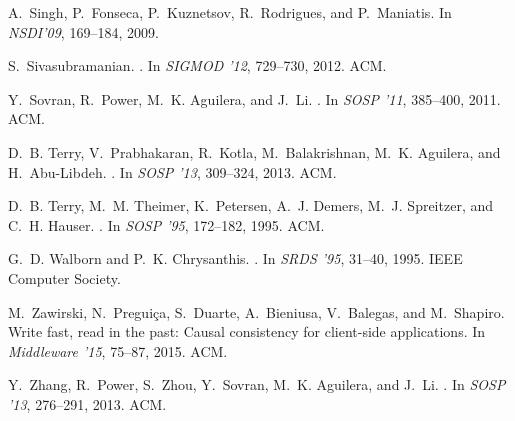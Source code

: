 \documentclass[11pt,dvipdfm]{article}
\begin{document}
\begin{thebibliography}{10}
\begin{small}
A.~Singh, P.~Fonseca, P.~Kuznetsov, R.~Rodrigues, and P.~Maniatis.
\newblock In {\em NSDI'09}, 169--184, 2009.

S.~Sivasubramanian.
.
\newblock In {\em SIGMOD '12}, 729--730, 2012. ACM.

Y.~Sovran, R.~Power, M.~K. Aguilera, and J.~Li.
.
\newblock In {\em SOSP  '11}, 385--400, 2011. ACM.


D.~B. Terry, V.~Prabhakaran, R.~Kotla, M.~Balakrishnan, M.~K. Aguilera, and
  H.~Abu-Libdeh.
.
\newblock In {\em SOSP '13}, 309--324, 2013. ACM.

D.~B. Terry, M.~M. Theimer, K.~Petersen, A.~J. Demers, M.~J. Spreitzer, and
  C.~H. Hauser.
.
\newblock In {\em SOSP  '95}, 172--182, 1995. ACM.

G.~D. Walborn and P.~K. Chrysanthis.
.
\newblock In {\em SRDS '95}, 31--40, 1995. IEEE Computer Society.


M.~Zawirski, N.~Pregui\c{c}a, S.~Duarte, A.~Bieniusa, V.~Balegas, and
  M.~Shapiro.
\newblock Write fast, read in the past: Causal consistency for client-side
  applications.
\newblock In {\em Middleware '15}, 75--87, 2015. ACM.


Y.~Zhang, R.~Power, S.~Zhou, Y.~Sovran, M.~K. Aguilera, and J.~Li.
.
\newblock In {\em SOSP '13}, 276--291, 2013. ACM.


\end{small}
\end{thebibliography}
\end{document}
